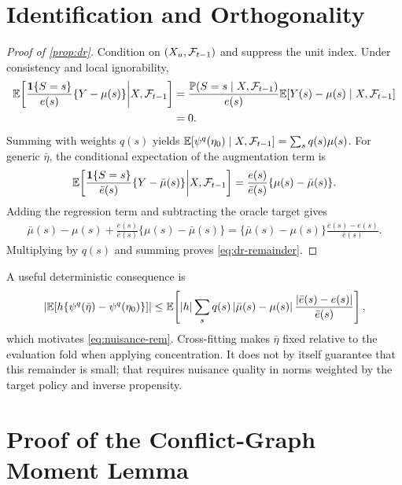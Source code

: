 \section{Identification and Orthogonality}
\label{app:identification}

\begin{proof}[Proof of \cref{prop:dr}]
Condition on $(X_u,\mathcal{F}_{t-1})$ and suppress the unit index. Under consistency and local ignorability,
\begin{align*}
\mathbb{E}\!\left[
\frac{\mathbf{1}\{S=s\}}{e(s)}\{Y-\mu(s)\}
\middle|X,\mathcal{F}_{t-1}
\right]
&=\frac{\mathbb{P}(S=s\mid X,\mathcal{F}_{t-1})}{e(s)}
\mathbb{E}[Y(s)-\mu(s)\mid X,\mathcal{F}_{t-1}]\\
&=0.
\end{align*}
Summing with weights $q(s)$ yields
$\mathbb{E}[\psi^q(\eta_0)\mid X,\mathcal{F}_{t-1}]=\sum_sq(s)\mu(s)$.
For generic $\bar\eta$, the conditional expectation of the augmentation term is
\begin{align*}
\mathbb{E}\!\left[
\frac{\mathbf{1}\{S=s\}}{\bar e(s)}\{Y-\bar\mu(s)\}
\middle|X,\mathcal{F}_{t-1}
\right]
=\frac{e(s)}{\bar e(s)}\{\mu(s)-\bar\mu(s)\}.
\end{align*}
Adding the regression term and subtracting the oracle target gives
\begin{align*}
\bar\mu(s)-\mu(s)
+\frac{e(s)}{\bar e(s)}\{\mu(s)-\bar\mu(s)\}
=\{\bar\mu(s)-\mu(s)\}\frac{\bar e(s)-e(s)}{\bar e(s)}.
\end{align*}
Multiplying by $q(s)$ and summing proves \cref{eq:dr-remainder}.
\end{proof}

A useful deterministic consequence is
\begin{equation}
\left|\mathbb{E}[h\{\psi^q(\bar\eta)-\psi^q(\eta_0)\}]\right|
\le
\mathbb{E}\!\left[
\left|h\right|\sum_s q(s)\left|\bar\mu(s)-\mu(s)\right|
\frac{\left|\bar e(s)-e(s)\right|}{\bar e(s)}
\right],
\end{equation}
which motivates \cref{eq:nuisance-rem}. Cross-fitting makes $\bar\eta$ fixed relative to the evaluation fold when applying concentration. It does not by itself guarantee that this remainder is small; that requires nuisance quality in norms weighted by the target policy and inverse propensity.

\section{Proof of the Conflict-Graph Moment Lemma}
\label{app:proof-graph}

